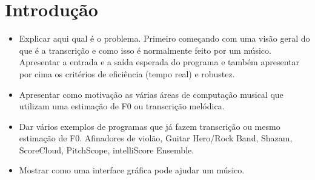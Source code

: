 \chapter{Introdução}
\label{cap:introducao}

\begin{itemize}
\item Explicar aqui qual é o problema. Primeiro começando com uma visão geral do que é a transcrição e como isso é normalmente feito por um músico. Apresentar a entrada e a saída esperada do programa e também apresentar por cima os critérios de eficiência (tempo real) e robustez.
\item Apresentar como motivação as várias áreas de computação musical que utilizam uma estimação de F0 ou transcrição melódica.
\item Dar vários exemplos de programas que já fazem transcrição ou mesmo estimação de F0. Afinadores de violão, Guitar Hero/Rock Band, Shazam, ScoreCloud, PitchScope, intelliScore Ensemble.
\item Mostrar como uma interface gráfica pode ajudar um músico.
\end{itemize}

%





